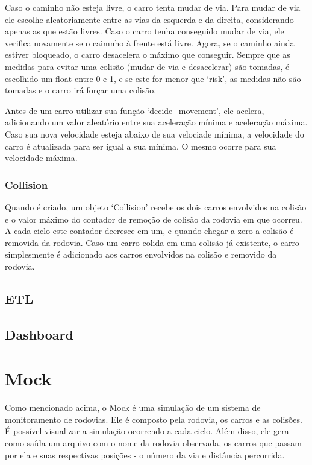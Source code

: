 \documentclass{article}
\begin{document}
    Caso o caminho não esteja livre, o carro tenta mudar de via. Para mudar de via ele escolhe aleatoriamente entre
    as vias da esquerda e da direita, considerando apenas as que estão livres. Caso o carro tenha conseguido mudar
    de via, ele verifica novamente se o caimnho à frente está livre. Agora, se o caminho ainda estiver bloqueado, o
    carro desacelera o máximo que conseguir. Sempre que as medidas para evitar uma colisão (mudar de via e desacelerar)
    são tomadas, é escolhido um float entre 0 e 1, e se este for menor que `risk', as medidas não são tomadas e o
    carro irá forçar uma colisão.

    Antes de um carro utilizar sua função `decide\_movement', ele acelera, adicionando um valor aleatório entre sua
    aceleração mínima e aceleração máxima. Caso sua nova velocidade esteja abaixo de sua velociade mínima, a velocidade
    do carro é atualizada para ser igual a sua mínima. O mesmo ocorre para sua velocidade máxima.
    
    \subsubsection*{Collision}
    Quando é criado, um objeto `Collision' recebe os dois carros envolvidos na colisão e o valor máximo do contador de
    remoção de colisão da rodovia em que ocorreu. A cada ciclo este contador decresce em um, e quando chegar a zero a
    colisão é removida da rodovia. Caso um carro colida em uma colisão já existente, o carro simplesmente é adicionado
    aos carros envolvidos na colisão e removido da rodovia.

    \subsection*{ETL}
    \lipsum[1]

    \subsection*{Dashboard}
    \lipsum[2]

    \section{Mock}
    Como mencionado acima, o Mock é uma simulação de um sistema de monitoramento de rodovias.
    Ele é composto pela rodovia, os carros e as colisões. É possível visualizar a simulação
    ocorrendo a cada ciclo. Além disso, ele gera como saída um arquivo com o nome da rodovia
    observada, os carros que passam por ela e suas respectivas posições - o número da via e 
    distância percorrida.
    
\end{document}
